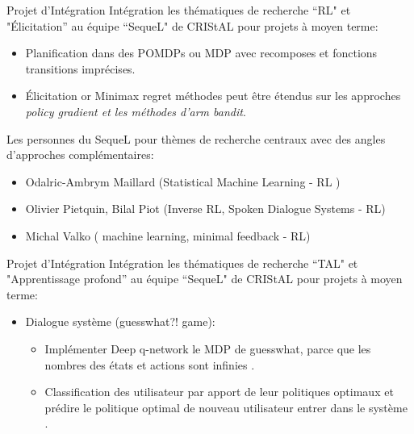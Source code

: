\begin{frame}{Projet d'Intégration}
Intégration les thématiques de recherche ``RL" et "\'Elicitation” au équipe ``SequeL" de CRIStAL pour projets à moyen terme:
\begin{block}

\begin{itemize}
	\item Planification dans des POMDPs ou MDP avec recomposes et fonctions transitions imprécises. 
	\item Élicitation or Minimax regret méthodes peut être étendus sur les approches \textit{policy gradient et les méthodes d'arm bandit}.
\end{itemize}
\end{block}

Les personnes du SequeL pour thèmes de recherche centraux avec des angles d’approches complémentaires:
\begin{block}

\begin{itemize}
	\item  Odalric-Ambrym Maillard (Statistical Machine Learning - RL )
	\item  Olivier Pietquin, Bilal Piot (Inverse RL, Spoken Dialogue Systems - RL)
	\item  Michal Valko ( machine learning, minimal feedback - RL)
	\end{itemize}
\end{block}
\end{frame}

\begin{frame}{Projet d'Intégration}
Intégration les thématiques de recherche ``TAL" et "Apprentissage profond” au équipe ``SequeL" de CRIStAL pour projets à moyen terme:
\begin{block}{}
	\begin{itemize}
		\item Dialogue système (guesswhat?! game):
			\begin{itemize}
				\item Implémenter Deep q-network le MDP de guesswhat, parce que les nombres des états et actions sont infinies \cite{strub}.
				\item Classification des utilisateur par apport de leur politiques optimaux et prédire le politique optimal de nouveau utilisateur entrer dans le système \cite{carrara}.  
			\end{itemize}
	\end{itemize}
\end{block}

\end{frame}